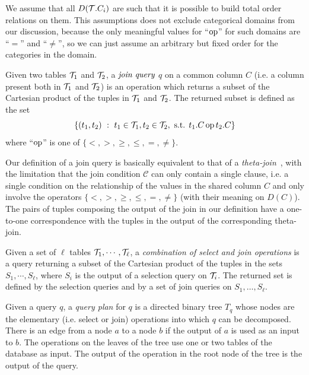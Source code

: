 We assume that all $D({\cal T}.C_i)$ are such that it is possible to build total
order relations on them. This assumptions does not exclude categorical domains
from our discussion, because the only meaningful values for ``$\operatorname{op}$'' for such
domains are ``$=$'' and ``$\neq$'', so we can just assume an arbitrary but fixed
order for the categories in the domain.

\begin{definition}\label{def:joinquery}
  Given two tables ${\cal T}_1$ and ${\cal T}_2$, a $\emph{join query}$ $q$ on a common
  column $C$ (i.e. a column present both in ${\cal T}_1$ and ${\cal T}_2$) is an
  operation which returns a subset of the Cartesian product of the tuples in
  ${\cal T}_1$ and ${\cal T}_2$. The returned subset is defined as the set
  \[
  \{(t_1,t_2) ~:~ t_1\in{\cal T}_1, t_2\in{\cal T}_2, \mbox{ s.t. } t_1.C \operatorname{op} t_2.C \}\]
  where ``$\operatorname{op}$'' is one of $\{<,>,\ge,\le,=,\neq\}$.
\end{definition}

Our definition of a join query is basically equivalent to that of a
\emph{theta-join}~\citep[Sect.5.2.7]{GarciaMolinaUW02}, with the limitation that
the join condition $\mathcal{C}$ can only contain a single clause, i.e. a single
condition on the relationship of the values in the shared column $C$ and only
involve the operators $\{<,>,\ge,\le,=,\neq\}$ (with their meaning on $D(C)$).
The pairs of tuples composing the output of the join in our definition have a
one-to-one correspondence with the tuples in the output of the corresponding
theta-join.

\begin{definition}\label{def:general query}
  Given a set of $\ell$ tables ${\cal T}_1,\cdots,{\cal T}_\ell$, a
  \emph{combination of select and join operations} is a query returning a subset
  of the Cartesian product of the tuples in the sets $S_1,\cdots,S_\ell$, where
  $S_i$ is the output of a selection query on ${\cal T}_i$. The returned set is
  defined by the selection queries and by a set of join queries on
  $S_1,\dots,S_\ell$.
\end{definition}

\begin{definition}\label{def:exectree}
  Given a query $q$, a \emph{query plan} for $q$ is a directed binary tree
  $T_q$ whose nodes are the elementary (i.e. select or join) operations into
  which $q$ can be decomposed. There is an edge from a node $a$ to a node $b$ if
  the output of $a$ is used as an input to $b$. The operations on the leaves of
  the tree use one or two tables of the database as input. The output of the
  operation in the root node of the tree is the output of the query.
\end{definition}

